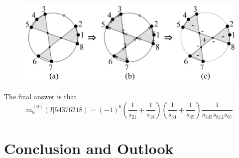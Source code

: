 \documentclass{beamer}
\begin{document}
\begin{frame}
    
    \begin{figure}
        \centering
        \includegraphics[width=1\linewidth]{6.png}
    \end{figure}
    The final answer is that
    \begin{equation*}
        m_8^{(0)}(I|54376218)=(-1)^6\left(\frac{1}{s_{21}}+\frac{1}{s_{18}}\right)\left(\frac{1}{s_{34}}+\frac{1}{s_{45}}\right)\frac{1}{s_{345}s_{812}s_{67}}
    \end{equation*}
\end{frame}
\section{Conclusion and Outlook}
\end{document}
